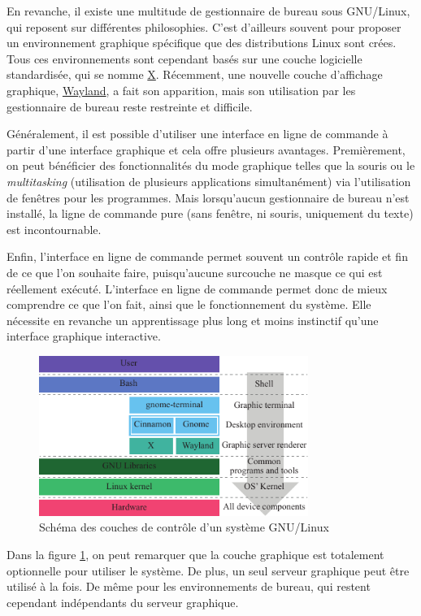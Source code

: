 En revanche, il existe une multitude de gestionnaire de bureau sous GNU/Linux, qui reposent sur différentes philosophies. C'est d'ailleurs souvent pour proposer un environnement graphique spécifique que des distributions Linux sont crées. Tous ces environnements sont cependant basés sur une couche logicielle standardisée, qui se nomme \href{https://www.x.org}{X}. Récemment, une nouvelle couche d'affichage graphique, \href{https://wayland.freedesktop.org}{Wayland}, a fait son apparition, mais son utilisation par les gestionnaire de bureau reste restreinte et difficile.

Généralement, il est possible d'utiliser une interface en ligne de commande à partir d'une interface graphique et cela offre plusieurs avantages. Premièrement, on peut bénéficier des fonctionnalités du mode graphique telles que la souris ou le \textit{multitasking} (utilisation de plusieurs applications simultanément) via l'utilisation de fenêtres pour les programmes. Mais lorsqu'aucun gestionnaire de bureau n'est installé, la ligne de commande pure (sans fenêtre, ni souris, uniquement du texte) est incontournable.

Enfin, l'interface en ligne de commande permet souvent un contrôle rapide et fin de ce que l'on souhaite faire, puisqu'aucune surcouche ne masque ce qui est réellement exécuté. L'interface en ligne de commande permet donc de mieux comprendre ce que l'on fait, ainsi que le fonctionnement du système. Elle nécessite en revanche un apprentissage plus long et moins instinctif qu'une interface graphique interactive.

\begin{figure}[hb!]
\includegraphics[width=0.78\textwidth]{res/linux_control_interface.pdf}
\centering
\caption{Schéma des couches de contrôle d'un système GNU/Linux}
\label{fig:interface}
\end{figure} \vspace{-2mm}

 Dans la figure \ref{fig:interface}, on peut remarquer que la couche graphique est totalement optionnelle pour utiliser le système. De plus, un seul serveur graphique peut être utilisé à la fois. De même pour les environnements de bureau, qui restent cependant indépendants du serveur graphique.